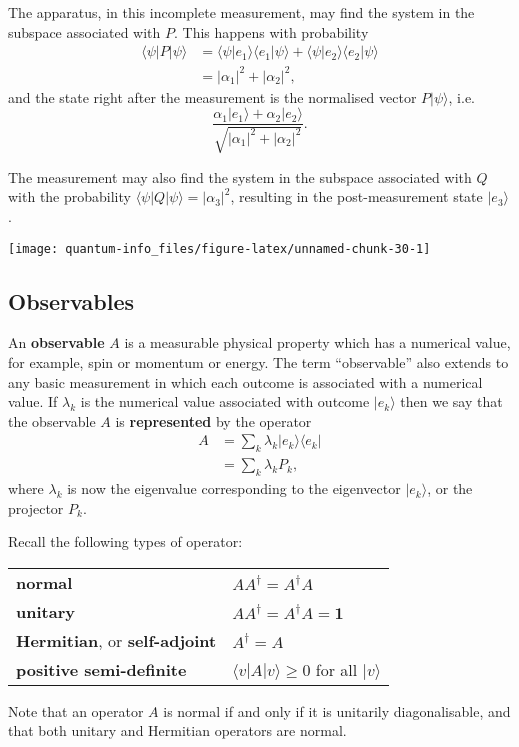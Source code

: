 \documentclass[fleqn]{article}
\renewcommand{\toprule}{}
\renewcommand{\bottomrule}{}
\newenvironment{idea}{\noindent}{\medskip}
\begin{document}
The apparatus, in this incomplete measurement, may find the system in the subspace associated with \(P\).
This happens with probability
\[
  \begin{aligned}
    \langle\psi|P|\psi\rangle
    &= \langle\psi|e_1\rangle \langle e_1|\psi\rangle + \langle\psi|e_2\rangle \langle e_2|\psi\rangle
  \\&= |\alpha_1|^2 + |\alpha_2|^2,
  \end{aligned}
\]
and the state right after the measurement is the normalised vector \(P|\psi\rangle\), i.e.
\[
  \frac{\alpha_1|e_1\rangle+\alpha_2|e_2\rangle}{\sqrt{|\alpha_1|^2 + |\alpha_2|^2}}.
\]

The measurement may also find the system in the subspace associated with \(Q\) with the probability \(\langle\psi|Q|\psi\rangle = |\alpha_3|^2\), resulting in the post-measurement state \(|e_3\rangle\).

\begin{center}\texttt{[image: quantum-info\_files/figure-latex/unnamed-chunk-30-1]} \end{center}

\hypertarget{observables}{%
\subsection{Observables}\label{observables}}

An \textbf{observable} \(A\) is a measurable physical property which has a numerical value, for example, spin or momentum or energy.
The term ``observable'' also extends to any basic measurement in which each outcome is associated with a numerical value.
If \(\lambda_k\) is the numerical value associated with outcome \(|e_k\rangle\) then we say that the observable \(A\) is \textbf{represented} by the operator
\[
  \begin{aligned}
    A
    &= \sum_k \lambda_k |e_k\rangle\langle e_k|
  \\&= \sum_k \lambda_k P_k,
  \end{aligned}
\]
where \(\lambda_k\) is now the eigenvalue corresponding to the eigenvector \(|e_k\rangle\), or the projector \(P_k\).

\begin{idea}

Recall the following types of operator:

\begin{longtable}[]{@{}ll@{}}
\toprule
\endhead
\textbf{normal} & \(AA^\dagger = A^\dagger A\)\tabularnewline
\textbf{unitary} & \(AA^\dagger = A^\dagger A = \mathbf{1}\)\tabularnewline
\textbf{Hermitian}, or \textbf{self-adjoint} & \(A^\dagger = A\)\tabularnewline
\textbf{positive semi-definite} & \(\langle v|A|v\rangle\geqslant 0\) for all \(|v\rangle\)\tabularnewline
\bottomrule
\end{longtable}

Note that an operator \(A\) is normal if and only if it is unitarily diagonalisable, and that both unitary and Hermitian operators are normal.

\end{idea}
\end{document}
